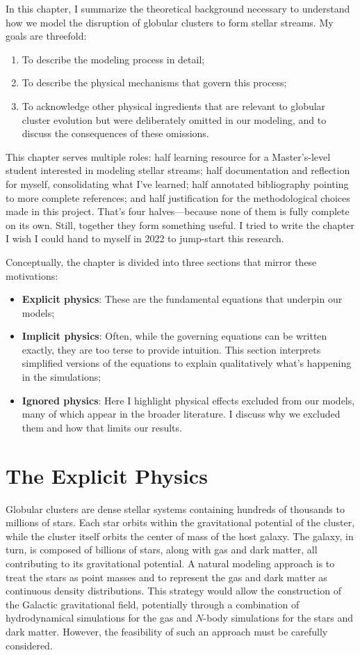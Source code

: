 \noindent In this chapter, I summarize the theoretical background necessary to understand how we model the disruption of globular clusters to form stellar streams. My goals are threefold:
\begin{enumerate}
    \item To describe the modeling process in detail;
    \item To describe the physical mechanisms that govern this process;
    \item To acknowledge other physical ingredients that are relevant to globular cluster evolution but were deliberately omitted in our modeling, and to discuss the consequences of these omissions. 
\end{enumerate}
This chapter serves multiple roles: half learning resource for a Master's-level student interested in modeling stellar streams; half documentation and reflection for myself, consolidating what I've learned; half annotated bibliography pointing to more complete references; and half justification for the methodological choices made in this project. That's four halves—because none of them is fully complete on its own. Still, together they form something useful. I tried to write the chapter I wish I could hand to myself in 2022 to jump-start this research.

Conceptually, the chapter is divided into three sections that mirror these motivations:

\begin{itemize}
    \item \textbf{Explicit physics}: These are the fundamental equations that underpin our models;
    \item \textbf{Implicit physics}: Often, while the governing equations can be written exactly, they are too terse to provide intuition. This section interprets simplified versions of the equations to explain qualitatively what's happening in the simulations;
    \item \textbf{Ignored physics}: Here I highlight physical effects excluded from our models, many of which appear in the broader literature. I discuss why we excluded them and how that limits our results.
\end{itemize}


\section{The Explicit Physics}

    Globular clusters are dense stellar systems containing hundreds of thousands to millions of stars. Each star orbits within the gravitational potential of the cluster, while the cluster itself orbits the center of mass of the host galaxy. The galaxy, in turn, is composed of billions of stars, along with gas and dark matter, all contributing to its gravitational potential. A natural modeling approach is to treat the stars as point masses and to represent the gas and dark matter as continuous density distributions. This strategy would allow the construction of the Galactic gravitational field, potentially through a combination of hydrodynamical simulations for the gas and $N$-body simulations for the stars and dark matter. However, the feasibility of such an approach must be carefully considered.

